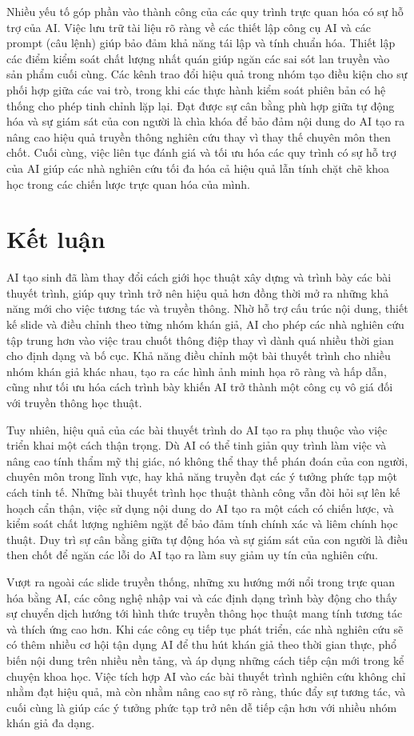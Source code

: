 Nhiều yếu tố góp phần vào thành công của các quy trình trực quan hóa có sự hỗ trợ của AI. Việc lưu trữ tài liệu rõ ràng về các thiết lập công cụ AI và các prompt (câu lệnh) giúp bảo đảm khả năng tái lập và tính chuẩn hóa. Thiết lập các điểm kiểm soát chất lượng nhất quán giúp ngăn các sai sót lan truyền vào sản phẩm cuối cùng. Các kênh trao đổi hiệu quả trong nhóm tạo điều kiện cho sự phối hợp giữa các vai trò, trong khi các thực hành kiểm soát phiên bản có hệ thống cho phép tinh chỉnh lặp lại. Đạt được sự cân bằng phù hợp giữa tự động hóa và sự giám sát của con người là chìa khóa để bảo đảm nội dung do AI tạo ra nâng cao hiệu quả truyền thông nghiên cứu thay vì thay thế chuyên môn then chốt. Cuối cùng, việc liên tục đánh giá và tối ưu hóa các quy trình có sự hỗ trợ của AI giúp các nhà nghiên cứu tối đa hóa cả hiệu quả lẫn tính chặt chẽ khoa học trong các chiến lược trực quan hóa của mình.

\section{Kết luận}

AI tạo sinh đã làm thay đổi cách giới học thuật xây dựng và trình bày các bài thuyết trình, giúp quy trình trở nên hiệu quả hơn đồng thời mở ra những khả năng mới cho việc tương tác và truyền thông. Nhờ hỗ trợ cấu trúc nội dung, thiết kế slide và điều chỉnh theo từng nhóm khán giả, AI cho phép các nhà nghiên cứu tập trung hơn vào việc trau chuốt thông điệp thay vì dành quá nhiều thời gian cho định dạng và bố cục. Khả năng điều chỉnh một bài thuyết trình cho nhiều nhóm khán giả khác nhau, tạo ra các hình ảnh minh họa rõ ràng và hấp dẫn, cũng như tối ưu hóa cách trình bày khiến AI trở thành một công cụ vô giá đối với truyền thông học thuật.

Tuy nhiên, hiệu quả của các bài thuyết trình do AI tạo ra phụ thuộc vào việc triển khai một cách thận trọng. Dù AI có thể tinh giản quy trình làm việc và nâng cao tính thẩm mỹ thị giác, nó không thể thay thế phán đoán của con người, chuyên môn trong lĩnh vực, hay khả năng truyền đạt các ý tưởng phức tạp một cách tinh tế. Những bài thuyết trình học thuật thành công vẫn đòi hỏi sự lên kế hoạch cẩn thận, việc sử dụng nội dung do AI tạo ra một cách có chiến lược, và kiểm soát chất lượng nghiêm ngặt để bảo đảm tính chính xác và liêm chính học thuật. Duy trì sự cân bằng giữa tự động hóa và sự giám sát của con người là điều then chốt để ngăn các lỗi do AI tạo ra làm suy giảm uy tín của nghiên cứu.

Vượt ra ngoài các slide truyền thống, những xu hướng mới nổi trong trực quan hóa bằng AI, các công nghệ nhập vai và các định dạng trình bày động cho thấy sự chuyển dịch hướng tới hình thức truyền thông học thuật mang tính tương tác và thích ứng cao hơn. Khi các công cụ tiếp tục phát triển, các nhà nghiên cứu sẽ có thêm nhiều cơ hội tận dụng AI để thu hút khán giả theo thời gian thực, phổ biến nội dung trên nhiều nền tảng, và áp dụng những cách tiếp cận mới trong kể chuyện khoa học. Việc tích hợp AI vào các bài thuyết trình nghiên cứu không chỉ nhằm đạt hiệu quả, mà còn nhằm nâng cao sự rõ ràng, thúc đẩy sự tương tác, và cuối cùng là giúp các ý tưởng phức tạp trở nên dễ tiếp cận hơn với nhiều nhóm khán giả đa dạng.

